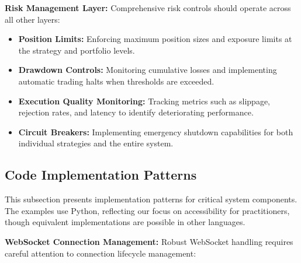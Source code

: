 \documentclass[12pt,a4paper]{article}
\begin{document}
\textbf{Risk Management Layer:} Comprehensive risk controls should operate across all other layers:

\begin{itemize}
\item \textbf{Position Limits:} Enforcing maximum position sizes and exposure limits at the strategy and portfolio levels.
\item \textbf{Drawdown Controls:} Monitoring cumulative losses and implementing automatic trading halts when thresholds are exceeded.
\item \textbf{Execution Quality Monitoring:} Tracking metrics such as slippage, rejection rates, and latency to identify deteriorating performance.
\item \textbf{Circuit Breakers:} Implementing emergency shutdown capabilities for both individual strategies and the entire system.
\end{itemize}

\subsection{Code Implementation Patterns}

This subsection presents implementation patterns for critical system components. The examples use Python, reflecting our focus on accessibility for practitioners, though equivalent implementations are possible in other languages.

\textbf{WebSocket Connection Management:} Robust WebSocket handling requires careful attention to connection lifecycle management:
\end{document}
